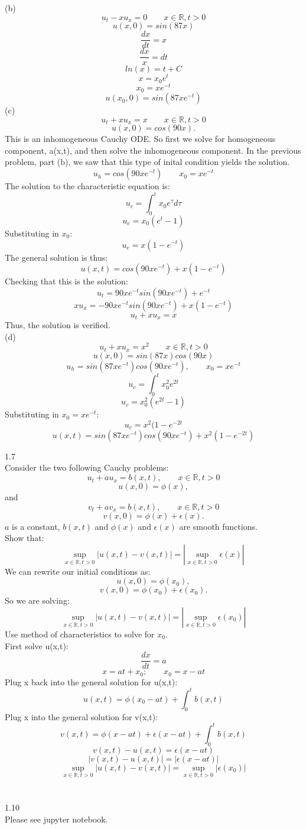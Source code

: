 \documentclass{article}
\begin{document}
(b) \[u_{t} - xu_{x} = 0 \qquad {x \in \mathbb{R}}, t>0 \]
\[u(x,0) = sin(87x) \]
\[ \frac{dx}{dt} = x \]
\[\frac{dx}{x} = dt\]
\[ ln(x) = t +C\]
\[ x = x_{0}e^{t}\]
\[x_{0} = xe^{-t} \]
\[u(x_{0},0) = sin(87xe^{-t})\]
(c) \[u_{t} + xu_{x} = x\qquad {x \in \mathbb{R}, t>0}\]
\[u(x,0) = cos(90x).\]
This is an inhomogeneous Cauchy ODE. So first we solve for homogeneous component, a(x,t), and then solve the inhomogeneous component. In the previous problem, part (b), we saw that this type of inital condition yields the solution.
\[u_{h} =cos(90xe^{-t})\qquad x_{0} = xe^{-t} \]
The solution to the characteristic equation is:
\[u_{c} = \int_{0}^t x_{0}e^{\tau}d\tau\]
\[ u_{c} = x_{0}(e^t-1)\]
Substituting in $x_{0}$:
\[u_{c} = x(1 -e^{-t})\]
The general solution is thus:
\[u(x,t)=cos(90xe^{-t}) +x(1-e^{-t})\]
Checking that this is the solution:\\
\[ u_{t} = 90xe^{-t}sin(90xe^{-t}) + e^{-t}\]
\[ xu_{x} = -90xe^{-t}sin(90xe^{-t}) + x(1-e^{-t})\]
\[u_{t} + xu_{x} = x\]
Thus, the solution is verified.\\
(d) \[u_{t} +xu_{x}  = x^2\qquad {x \in \mathbb{R}, t>0}\] 
\[u(x,0) = sin(87x)cos(90x)\]
\[u_{h} = sin(87xe^{-t})cos(90xe^{-t}),\qquad x_{0} = xe^{-t}\]
\[u_{c} = \int_{0}^t x_{0}^2e^{2t}\]
\[u_{c}=x_{0}^2(e^{2t}-1) \]
Substituting in $x_{0} = xe^{-t}$:
\[u_{c} = x^2(1-e^{-2t}\]
\[u(x,t) = sin(87xe^{-t})cos(90xe^{-t})+ x^2(1-e^{-2t})\]

1.7\\
Consider the two following Cauchy problems:
\[u_{t} + au_{x} =b(x,t),\qquad {x\in \mathbb{R}, t>0}\]
\[u(x,0) = \phi(x),\]
and
\[v_{t} + av_{x} =b(x,t),\qquad {x\in \mathbb{R}, t>0}\]
\[v(x,0) = \phi(x) +\epsilon(x).\]
$a$ is a constant, $b(x,t)$ and $\phi(x) $ and $\epsilon(x)$ are smooth functions.\\
Show that:
\[\sup_{x \in \mathbb{R}, t>0} |u(x,t)-v(x,t)|=|\sup_{x \in \mathbb{R}, t>0}\epsilon(x)|\]
 We can rewrite our initial conditions as:\\
\[u(x,0) = \phi(x_{0}),\]
\[v(x,0) = \phi(x_{0}) +\epsilon(x_{0}).\]
So we are solving:\\ 
\[\sup_{x \in \mathbb{R}, t>0} |u(x,t)-v(x,t)|=|\sup_{x \in \mathbb{R}, t>0}\epsilon(x_{0})|\]
Use method of characteristics to solve for $x_{0}$.\\
First solve u(x,t):\\
\[ \frac{dx}{dt} = a\]
\[ x = at + x_{0};\qquad x_{0} = x-at\]
Plug x back into the general solution for u(x,t):\\
\[u(x,t) = \phi(x_{0} -at) +  \int_{0}^{t} b(x,t)\]
Plug x into the general solution for v(x,t):\\
\[v(x,t) = \phi(x-at) + \epsilon(x-at) + \int_{0}^{t} b(x,t)\]
\[ v(x,t) - u(x,t) = \epsilon(x-at)\] 
\[ |v(x,t) - u(x,t)| = |\epsilon(x-at)|\] 
\[\sup_{x \in \mathbb{R}, t>0} |u(x,t)-v(x,t)|=\sup_{x \in \mathbb{R}, t>0}|\epsilon(x_{0})|\]\\
\\
1.10\\
\large Please see jupyter notebook.\\
\normalsize
\end{document}
